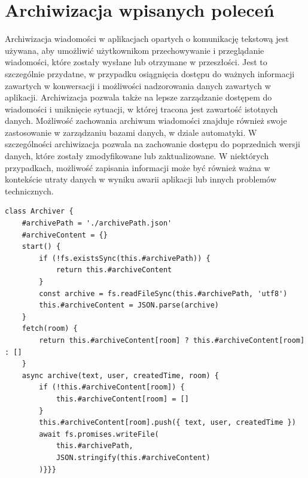 \section{Archiwizacja wpisanych poleceń}
Archiwizacja wiadomości w aplikacjach opartych o komunikację tekstową jest używana, aby umożliwić użytkownikom przechowywanie i przeglądanie wiadomości, które zostały wysłane lub otrzymane w przeszłości. Jest to szczególnie przydatne, w przypadku osiągnięcia dostępu do ważnych informacji zawartych w konwersacji i możliwości nadzorowania danych zawartych w aplikacji. Archiwizacja pozwala także na lepsze zarządzanie dostępem do wiadomości i uniknięcie sytuacji, w której tracona jest zawartość istotnych danych. Możliwość zachowania archiwum wiadomości znajduje również swoje zastosowanie w zarządzaniu bazami danych, w dziale automatyki. W szczególności archiwizacja pozwala na zachowanie dostępu do poprzednich wersji danych, które zostały zmodyfikowane lub zaktualizowane. W niektórych przypadkach, możliwość zapisania informacji może być również ważna w kontekście utraty danych w wyniku awarii aplikacji lub innych problemów technicznych.
 \begin{lstlisting}[caption=Implementacja funkcji archiwizującej wiadomości w komunikatorze]
class Archiver {
    #archivePath = './archivePath.json'
    #archiveContent = {}
    start() {
        if (!fs.existsSync(this.#archivePath)) {
            return this.#archiveContent
        }
        const archive = fs.readFileSync(this.#archivePath, 'utf8')
        this.#archiveContent = JSON.parse(archive)
    }
    fetch(room) {
        return this.#archiveContent[room] ? this.#archiveContent[room] : []
    }
    async archive(text, user, createdTime, room) {
        if (!this.#archiveContent[room]) {
            this.#archiveContent[room] = []
        }
        this.#archiveContent[room].push({ text, user, createdTime })
        await fs.promises.writeFile(
            this.#archivePath,
            JSON.stringify(this.#archiveContent)
        )}}}
\end{lstlisting}

